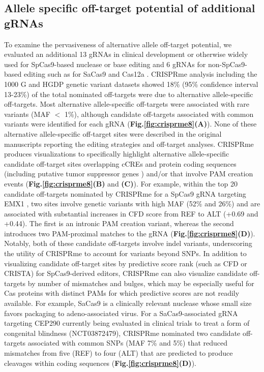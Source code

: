 \documentclass[a4paper, titlepage, openright]{book}
\newcommand{\crisprme}{CRISPRme\xspace}
\begin{document}
\subsection{Allele specific off-target potential of additional gRNAs}
To examine the pervasiveness of alternative allele off-target potential, we evaluated an additional 13 gRNAs in clinical development or otherwise widely used for SpCas9-based nuclease or base editing \citep{xu2017crispr, xu2019crispr, stadtmauer2020crispr, gillmore2021crispr, dewitt2016selection, xu2019editing, metais2019genome, tsai2015guide, zeng2020therapeutic, musunuru2021vivo} and 6 gRNAs for non-SpCas9-based editing such as for SaCas9 and Cas12a \citep{xu2019editing, chu2021rationally, newby2021base, maeder2019development, de2019edit}. \crisprme analysis including the 1000 G and HGDP genetic variant datasets showed 18\% (95\% confidence interval 13-23\%) of the total nominated off-targets were due to alternative allele-specific off-targets. Most alternative allele-specific off-targets were associated with rare variants (MAF $<$ 1\%),  although candidate off-targets associated with common variants were identified for each gRNA (\textbf{Fig.\ref{fig:crisprme8}(A)}). None of these alternative allele-specific off-target sites were described in the original manuscripts reporting the editing strategies and off-target analyses. CRISPRme produces visualizations to specifically highlight alternative allele-specific candidate off-target sites overlapping cCREs and protein coding sequences (including putative tumor suppressor genes \citep{zhao2016tsgene}) and/or that involve PAM creation events (\textbf{Fig.\ref{fig:crisprme8}(B)} and \textbf{(C)}). For example, within the top 20 candidate off-targets nominated by CRISPRme for a SpCas9 gRNA targeting EMX1 \citep{tsai2015guide}, two sites involve genetic variants with high MAF (52\% and 26\%) and are associated with substantial increases in CFD score from REF to ALT (+0.69 and +0.44). The first is an intronic PAM creation variant, whereas the second introduces two PAM-proximal matches to the gRNA (\textbf{Fig.\ref{fig:crisprme8}(D)}).  Notably, both of these candidate off-targets involve indel variants, underscoring the utility of CRISPRme to account for variants beyond SNPs. In addition to visualizing candidate off-target sites by predictive score rank (such as CFD or CRISTA) for SpCas9-derived editors, \crisprme can also visualize candidate off-targets by number of mismatches and bulges, which may be especially useful for Cas proteins with distinct PAMs for which predictive scores are not readily available. For example, SaCas9 is a clinically relevant nuclease whose small size favors packaging to adeno-associated virus. For a SaCas9-associated gRNA targeting CEP290 \citep{maeder2019development} currently being evaluated in clinical trials to treat a form of congenital blindness (NCT03872479), CRISPRme nominated two candidate off-targets associated with common SNPs (MAF 7\% and 5\%) that reduced mismatches from five (REF) to four (ALT) that are predicted to produce cleavages within coding sequences (\textbf{Fig.\ref{fig:crisprme8}(D)}).
\end{document}
